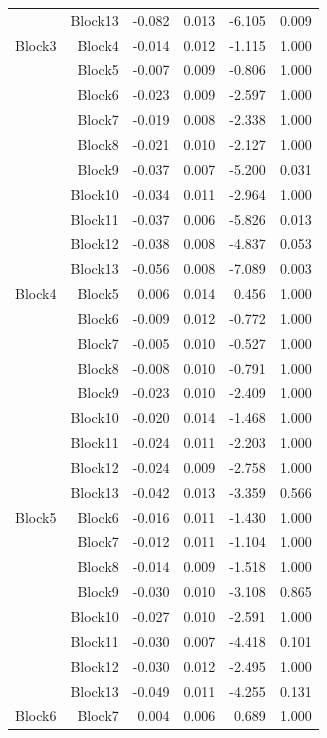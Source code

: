 \begin{longtable}{lrrrrr}
	 & Block13 & -0.082 & 0.013 & -6.105 & 0.009  \\
	Block3 & Block4 & -0.014 & 0.012 & -1.115 & 1.000  \\
	  & Block5 & -0.007 & 0.009 & -0.806 & 1.000  \\
	 & Block6 & -0.023 & 0.009 & -2.597 & 1.000  \\
	 & Block7 & -0.019 & 0.008 & -2.338 & 1.000  \\
	 & Block8 & -0.021 & 0.010 & -2.127 & 1.000  \\
	 & Block9 & -0.037 & 0.007 & -5.200 & 0.031  \\
	 & Block10 & -0.034 & 0.011 & -2.964 & 1.000  \\
	 & Block11 & -0.037 & 0.006 & -5.826 & 0.013  \\
	 & Block12 & -0.038 & 0.008 & -4.837 & 0.053  \\
	 & Block13 & -0.056 & 0.008 & -7.089 & 0.003  \\
	Block4 & Block5 & 0.006 & 0.014 & 0.456 & 1.000  \\
	  & Block6 & -0.009 & 0.012 & -0.772 & 1.000  \\
	 & Block7 & -0.005 & 0.010 & -0.527 & 1.000  \\
	 & Block8 & -0.008 & 0.010 & -0.791 & 1.000  \\
	 & Block9 & -0.023 & 0.010 & -2.409 & 1.000  \\
	 & Block10 & -0.020 & 0.014 & -1.468 & 1.000  \\
	 & Block11 & -0.024 & 0.011 & -2.203 & 1.000  \\
	 & Block12 & -0.024 & 0.009 & -2.758 & 1.000  \\
	 & Block13 & -0.042 & 0.013 & -3.359 & 0.566  \\
	Block5 & Block6 & -0.016 & 0.011 & -1.430 & 1.000  \\
	  & Block7 & -0.012 & 0.011 & -1.104 & 1.000  \\
	 & Block8 & -0.014 & 0.009 & -1.518 & 1.000  \\
	 & Block9 & -0.030 & 0.010 & -3.108 & 0.865  \\
	 & Block10 & -0.027 & 0.010 & -2.591 & 1.000  \\
	 & Block11 & -0.030 & 0.007 & -4.418 & 0.101  \\
	 & Block12 & -0.030 & 0.012 & -2.495 & 1.000  \\
	 & Block13 & -0.049 & 0.011 & -4.255 & 0.131  \\
	Block6 & Block7 & 0.004 & 0.006 & 0.689 & 1.000  \\

\end{longtable}
